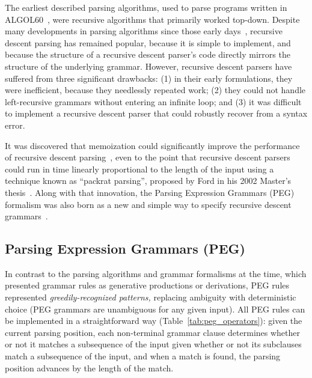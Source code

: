 \documentclass[manuscript]{acmart}
\begin{document}
The earliest described parsing algorithms, used to parse programs written in ALGOL60~\cite{irons1961syntax,lucas1961structure}, were recursive algorithms that primarily worked top-down. Despite many developments in parsing algorithms since those early days~\cite{kegler2023parsing}, recursive descent parsing has remained popular, because it is simple to implement, and because the structure of a recursive descent parser's code directly mirrors the structure of the underlying grammar. However, recursive descent parsers have suffered from three significant drawbacks: (1) in their early formulations, they were inefficient, because they needlessly repeated work; (2) they could not handle left-recursive grammars without entering an infinite loop; and (3) it was difficult to implement a recursive descent parser that could robustly recover from a syntax error. %


It was discovered that memoization could significantly improve the performance of recursive descent parsing~\cite{norvig1991}, even to the point that recursive descent parsers could run in time linearly proportional to the length of the input using a technique known as ``packrat parsing'', proposed by Ford in his 2002 Master's thesis~\cite{ford2002}. Along with that innovation, the Parsing Expression Grammars (PEG) formalism was also born as a new and simple way to specify recursive descent grammars~\cite{ford2002,ford2002b,ford2004}.

\subsection{\label{sec:peg_grammars}Parsing Expression Grammars (PEG)}

In contrast to the parsing algorithms and grammar formalisms at the time, which presented grammar rules as generative productions or derivations, PEG rules represented \emph{greedily-recognized patterns,} replacing ambiguity with deterministic choice (PEG grammars are unambiguous for any given input). All PEG rules can be implemented in a straightforward way (Table~\ref{tab:peg_operators}): given the current parsing position, each non-terminal grammar clause determines whether or not it matches a subsequence of the input given whether or not its subclauses match a subsequence of the input, and when a match is found, the parsing position advances by the length of the match.
\end{document}
